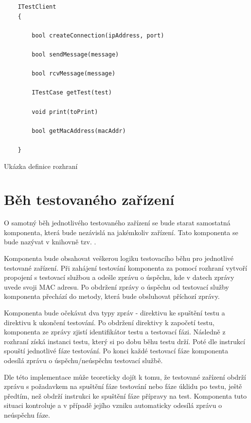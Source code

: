 \begin{listing}[htbp]
    \begin{verbatim}
    ITestClient 
    {

        bool createConnection(ipAddress, port)

        bool sendMessage(message)

        bool rcvMessage(message)

        ITestCase getTest(test)

        void print(toPrint)

        bool getMacAddress(macAddr)
    
    }
    \end{verbatim}
\caption{Ukázka definice rozhraní}
\label{listing:dev_if_abstract}
\end{listing}

\section{Běh testovaného zařízení}

O samotný běh jednotlivého testovaného zařízení se bude starat samostatná komponenta, která bude nezávislá na jakémkoliv zařízení. Tato komponenta se bude nazývat v knihovně tzv. .

Komponenta bude obsahovat veškerou logiku testovacího běhu pro jednotlivé testované zařízení. Při zahájení testování komponenta za pomocí rozhraní vytvoří propojení s testovací službou a odešle zprávu o úspěchu, kde v datech zprávy uvede svoji MAC adresu. Po obdržení zprávy o úspěchu od testovací služby komponenta přechází do metody, která bude obsluhovat příchozí zprávy. 

Komponenta bude očekávat dva typy zpráv - direktivu ke spuštění testu a direktivu k ukončení testování. Po obdržení direktivy k započetí testu, komponenta ze zprávy zjistí identifikátor testu a testovací fázi. Následně z rozhraní získá instanci testu, který si po dobu běhu testu drží. Poté dle instrukcí spouští jednotlivé fáze testování. Po konci každé testovací fáze komponenta odesílá zprávu o úspěchu/neúspěchu testovací službě.

Dle této implementace může teoreticky dojít k tomu, že testované zařízení obdrží zprávu s požadavkem na spuštění fáze testování nebo fáze úklidu po testu, ještě předtím, než obdrží instrukci ke spuštění fáze přípravy na test. Komponenta tuto situaci kontroluje a v případě jejího vzniku automaticky odesílá zprávu o neúspěchu fáze. 

